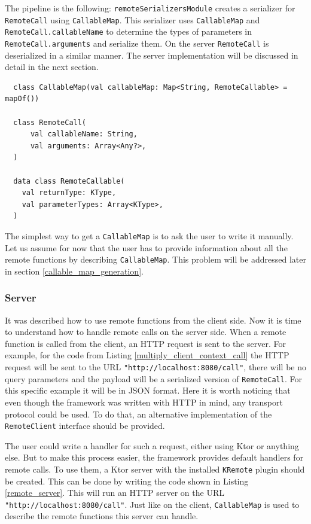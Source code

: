 \documentclass[a4paper,11pt,oneside]{article}
\newcommand{\kotlini}[1]{\texttt{#1}}
\newcommand{\ki}[1]{\kotlini{#1}}
\begin{document}
The pipeline is the following: \kotlini{remoteSerializersModule} creates a serializer for
\kotlini{RemoteCall} using \kotlini{CallableMap}. This serializer uses \kotlini{CallableMap} and
\kotlini{RemoteCall.callableName} to determine the types of parameters in
\kotlini{RemoteCall.arguments} and serialize them. On the server \kotlini{RemoteCall} is
deserialized in a similar manner. The server implementation will be discussed in detail in the next
section.

\begin{listing}[!h]
  \begin{verbatim}
  class CallableMap(val callableMap: Map<String, RemoteCallable> = mapOf())

  class RemoteCall(
      val callableName: String,
      val arguments: Array<Any?>,
  )

  data class RemoteCallable(
    val returnType: KType,
    val parameterTypes: Array<KType>,
  )
  \end{verbatim}
  \caption{RemoteCall and RemoteCallable class}\label{remote_call_and_callable_class}
\end{listing}

The simplest way to get a \ki{CallableMap} is to ask the user to write it manually. Let us assume for now
that the user has to provide information about all the remote functions by describing \kotlini{CallableMap}.
This problem will be addressed later in section \ref{callable_map_generation}.

\subsubsection{Server}

It was described how to use remote functions from the client side. Now it is time to understand how to
handle remote calls on the server side. When a remote function is called from the client, an HTTP request is
sent to the server. For example, for the code from Listing \ref{multiply_client_context_call} the HTTP request will be sent to the URL
\kotlini{"http://localhost:8080/call"}, there will be no query parameters and the payload will be a
serialized version of \kotlini{RemoteCall}. For this specific example it will be in JSON format. Here it 
is worth noticing that even though the framework was written with HTTP in mind, any transport protocol 
could be used. To do that, an alternative implementation of the \kotlini{RemoteClient} interface should be provided.

The user could write a handler for such a request, either using Ktor or anything else. But to make
this process easier, the framework provides default handlers for remote calls. To use them, a Ktor server
with the installed \kotlini{KRemote} plugin should be created. This can be done by writing the code shown in Listing
\ref{remote_server}. This will run an HTTP server on the URL \kotlini{"http://localhost:8080/call"}.
Just like on the client, \kotlini{CallableMap} is used to describe the remote functions this server can handle.
\end{document}
